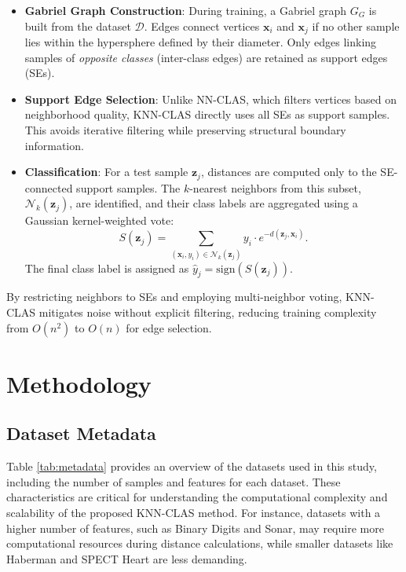 \documentclass[conference]{IEEEtran}
\begin{document}
\begin{itemize}
    \item \textbf{Gabriel Graph Construction}: During training, a Gabriel graph \( G_G \) is built from the dataset \( \mathcal{D} \). Edges connect vertices \( \mathbf{x}_i \) and \( \mathbf{x}_j \) if no other sample lies within the hypersphere defined by their diameter. Only edges linking samples of \textit{opposite classes} (inter-class edges) are retained as support edges (SEs).

    \item \textbf{Support Edge Selection}: Unlike NN-CLAS, which filters vertices based on neighborhood quality, KNN-CLAS directly uses all SEs as support samples. This avoids iterative filtering while preserving structural boundary information.

    \item \textbf{Classification}: For a test sample \( \mathbf{z}_j \), distances are computed only to the SE-connected support samples. The \( k \)-nearest neighbors from this subset, \( \mathcal{N}_k(\mathbf{z}_j) \), are identified, and their class labels are aggregated using a Gaussian kernel-weighted vote:
    \[
    S(\mathbf{z}_j) = \sum_{(\mathbf{x}_i, y_i) \in \mathcal{N}_k(\mathbf{z}_j)} y_i \cdot e^{-d(\mathbf{z}_j, \mathbf{x}_i)}.
    \]
    The final class label is assigned as \( \hat{y}_j = \text{sign}(S(\mathbf{z}_j)) \).
\end{itemize}

By restricting neighbors to SEs and employing multi-neighbor voting, KNN-CLAS mitigates noise without explicit filtering, reducing training complexity from \( O(n^2) \) to \( O(n) \) for edge selection.

\section{Methodology}

\subsection{Dataset Metadata}


Table \ref{tab:metadata} provides an overview of the datasets used in this study, including the number of samples and features for each dataset. These characteristics are critical for understanding the computational complexity and scalability of the proposed KNN-CLAS method. For instance, datasets with a higher number of features, such as Binary Digits and Sonar, may require more computational resources during distance calculations, while smaller datasets like Haberman and SPECT Heart are less demanding.
\end{document}
